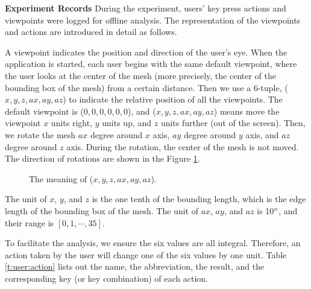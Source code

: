 \textbf{Experiment Records}
During the experiment, users' key press actions and viewpoints
were logged for offline analysis. The representation of the viewpoints
and actions are introduced in detail as follows.

A viewpoint indicates the position and direction of the user's eye.
When the application is started, each user begins with the same default viewpoint,
where the user looks at the center of the mesh (more precisely,  the center of the bounding box of the mesh)
from a certain distance. 
Then we use a 6-tuple, ($x, y, z, ax, ay, az$) to indicate the relative position of all the viewpoints. 
The default viewpoint is ($0, 0, 0, 0, 0, 0$), and ($x, y, z, ax, ay, az$) means
move the viewpoint $x$ units right, $y$ units up, and $z$ units further (out of the screen). 
Then, we rotate the mesh $ax$ degree around $x$ axis, $ay$ degree around $y$ axis,
and $az$ degree around $z$ axis. During the rotation, the center of the mesh is not moved.
The direction of rotations are shown in the Figure \ref{f:user:viewpoint}.
\begin{figure}
    \centering
    \caption{The meaning of ($x, y, z, ax, ay, az$).}
    \label{f:user:viewpoint}
\end{figure}
The unit of $x$, 
$y$, and $z$ is the one tenth of the bounding length, which is the edge length
of the bounding box of the mesh. The unit of $ax$, $ay$, and $az$ is 10$^\circ$,
and their range is $[0, 1, \cdots, 35]$.

To facilitate the analysis, we ensure the six values are all integral. 
Therefore, an action taken by the user will change one of the six values by one unit.
Table \ref{t:user:action} lists out the name, the abbreviation, the result,
and the corresponding key (or key combination) of each action.%

